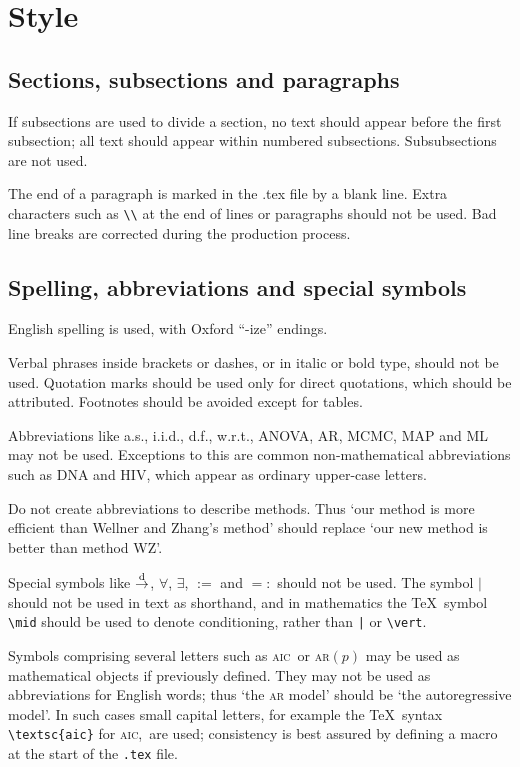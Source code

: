 \documentclass[article,lineno]{biometrika}
\def\AIC{\textsc{aic}}
\begin{document}
\section{Style}

\subsection{Sections, subsections and paragraphs}

If subsections are used to divide a section, no text should appear before the first subsection; all text should appear within numbered subsections.  Subsubsections are not used.

The end of a paragraph is marked in the .tex file by a blank line.  Extra characters such as \verb+\\+ at the end of lines or paragraphs should not be used.  Bad line breaks are corrected during the production process.

\subsection{Spelling, abbreviations and special symbols}

English spelling is used, with Oxford ``-ize'' endings.

Verbal phrases inside brackets or dashes, or in italic or bold type, should not be used. Quotation marks should be used only for direct quotations, which should be attributed. Footnotes should be avoided except for tables.

Abbreviations like a.s., i.i.d., d.f., w.r.t.,  ANOVA, AR, MCMC, MAP and ML may not be used.  Exceptions to this are common non-mathematical abbreviations such as DNA and HIV, which appear as ordinary upper-case letters.

Do not create abbreviations to describe methods. Thus `our method is more efficient than Wellner and Zhang's method' should replace `our new method is better than method WZ'.

Special symbols like $\mathop{\rightarrow}\limits^{\rm d}$, $\forall$, $\exists$, $:=$ and $=:$  should not be used.  The symbol $\mid$ should not be used in text as shorthand, and in mathematics the \TeX\ symbol \verb+\mid+ should be used to denote conditioning, rather than \verb+|+ or \verb"\vert".

Symbols comprising several letters such as \AIC\ or \textsc{ar}$(p)$ may be used as mathematical objects if previously defined. They may not be used as abbreviations for English words; thus `the \textsc{ar} model' should be `the autoregressive model'.   In such cases small capital letters, for example the  \TeX\ syntax \verb+\textsc{aic}+ for \AIC,\ are used; consistency is best assured by defining a macro at the start of the \texttt{.tex}  file.
\end{document}
